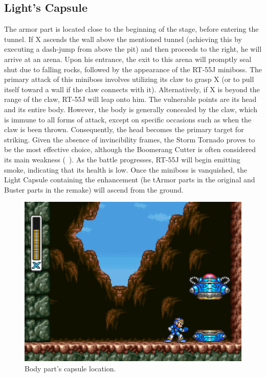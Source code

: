 \subsection{Light's Capsule}
The armor part is located close to the beginning of the stage, before entering the tunnel. If X ascends the wall above the mentioned tunnel (achieving this by executing a dash-jump from above the pit) and then proceeds to the right, he will arrive at an arena. Upon his entrance, the exit to this arena will promptly seal shut due to falling rocks,  followed by the appearance of the RT-55J miniboss. The primary attack of this miniboss involves utilizing its claw to grasp X (or to pull itself toward a wall if the claw connects with it). Alternatively, if X is beyond the range of the claw, RT-55J will leap onto him. The vulnerable points are its head and its entire body. However, the body is generally concealed by the claw, which is immune to all forms of attack, except on specific occasions such as when the claw is been thrown. Consequently, the head becomes the primary target for striking. Given the absence of invincibility frames, the Storm Tornado proves to be the most effective choice, although the Boomerang Cutter is often considered its main weakness (~\cite{wiki:RT55J}). As the battle progresses, RT-55J will begin emitting smoke, indicating that its health is low. Once the miniboss is vanquished, the Light Capsule containing the enhancement (he tArmor parts in the original and Buster parts in the remake) will ascend from the ground.

\begin{figure}[htp]
	\centering
	\includegraphics[width=0.5\linewidth]{figures/X1/Sting_chameleon/Sting_armor_capsule.jpg}
	\caption{Body part's capsule location.}
\end{figure}

